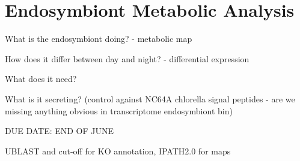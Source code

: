 \graphicspath{{chapters/6.Chapter_4/figures}}

\chapter{Endosymbiont Metabolic Analysis}

What is the endosymbiont doing? - metabolic map

How does it differ between day and night? - differential expression

What does it need?

What is it secreting? (control against NC64A chlorella signal peptides - are we missing anything obvious in transcriptome endosymbiont bin)

DUE DATE: END OF JUNE


UBLAST and cut-off for KO annotation, IPATH2.0 for maps  \citep{Wisecaver2014}

